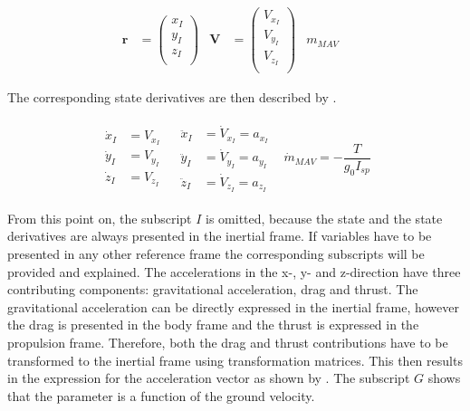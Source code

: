 \begin{align} \label{eq:state}
\mathbf{r}&=\begin{pmatrix}
x_{I}\\
y_{I}\\
z_{I}\\
\end{pmatrix}
&
\mathbf{V}&=\begin{pmatrix}
V_{x_{I}} \\
V_{y_{I}} \\
V_{z_{I}}\\
\end{pmatrix}
&
m_{MAV}&
\end{align}


\noindent
The corresponding state derivatives are then described by .

\begin{align} \label{eq:state_derivatives}
\begin{split} 
\dot{x}_{I}&=V_{x_{I}}\\
\dot{y}_{I}&=V_{y_{I}}\\
\dot{z}_{I}&=V_{z_{I}}
\end{split} 
&
\begin{split}
\ddot{x}_{I}&=\dot{V}_{x_{I}}=a_{x_{I}}\\
\ddot{y}_{I}&=\dot{V}_{y_{I}}=a_{y_{I}}\\
\ddot{z}_{I}&=\dot{V}_{z_{I}}=a_{z_{I}}
\end{split}
&
\dot{m}_{MAV}=-\dfrac{T}{g_{0}I_{sp}}
\end{align}

\noindent
From this point on, the subscript $I$ is omitted, because the state and the state derivatives are always presented in the inertial frame. If variables have to be presented in any other reference frame the corresponding subscripts will be provided and explained. The accelerations in the x-, y- and z-direction have three contributing components: gravitational acceleration, drag and thrust. The gravitational acceleration can be directly expressed in the inertial frame, however the drag is presented in the body frame and the thrust is expressed in the propulsion frame. Therefore, both the drag and thrust contributions have to be transformed to the inertial frame using transformation matrices. This then results in the expression for the acceleration vector as shown by . The subscript $G$ shows that the parameter is a function of the ground velocity.

